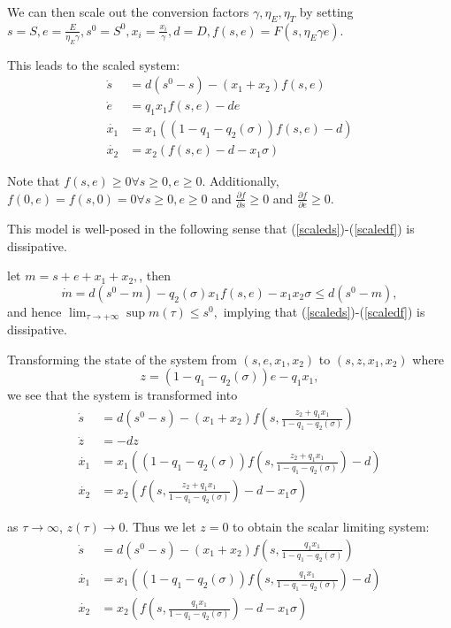 \documentclass[12pt]{article}
\begin{document}
\noindent We can then scale out the conversion factors $\gamma, \eta_E , \eta_T$ by setting $s=S, e=\frac{E}{\eta_E \gamma}, s^0=S^0, x_i=\frac{x_i}{\gamma}, d=D, f(s,e)=F(s,\eta_E \gamma e)$. 

This leads to the scaled system: 
\begin{align}
\dot{s}&=d(s^0-s)-(x_1 + x_2) f(s,e) \label{scaleds}\\
\dot{e}&=q_1 x_1 f(s,e)-de\\
\dot{x_1} &= x_1((1-q_1-q_2(\sigma ))f(s,e)-d)\\
\dot{x_2}&=x_2(f(s,e)-d-x_1 \sigma)\label{scaledf}
\end{align}

\noindent Note that $f(s,e) \geq 0 \forall s\geq 0, e\geq 0.$ Additionally, $f(0,e)=f(s,0)=0 \forall s\geq 0, e\geq 0$ and $\frac{\partial f}{\partial s} \geq 0$ and $\frac{\partial f}{\partial e} \geq 0$.  

\noindent This model is well-posed in the following sense that (\ref{scaleds})-(\ref{scaledf}) is dissipative.

\noindent let $m=s+e+x_1+x_2,$, then $$\dot{m}=d(s^0-m)-q_2(\sigma )x_1 f(s,e)- x_1 x_2 \sigma \leq d(s^0-m),$$ and hence $\lim_{\tau \rightarrow +\infty} \sup m(\tau) \leq s^0,$ implying that (\ref{scaleds})-(\ref{scaledf}) is dissipative. 

Transforming the state of the system from $(s,e,x_1,x_2)$ to $(s,z,x_1,x_2)$ where $$z=(1-q_1-q_2(\sigma ))e-q_1x_1,$$ we see that the system is transformed into
\begin{align*}
\dot{s}&=d(s^0-s)-(x_1+x_2)f(s,\frac{z_2+q_1 x_1}{1-q_1-q_2(\sigma )})\\
\dot{z}&=-dz\\
\dot{x_1}&=x_1((1-q_1-q_2(\sigma ))f(s,{\frac{z_2+q_1 x_1}{1-q_1-q_2(\sigma )}})-d)\\
\dot{x_2}&=x_2(f(s,{\frac{z_2+q_1 x_1}{1-q_1-q_2(\sigma )}})-d-x_1 \sigma)
\end{align*}

\noindent as $\tau \rightarrow \infty$, $z(\tau )\rightarrow 0$. Thus we let $z=0$ to obtain the scalar limiting system: 
\begin{align}
\dot{s}&=d(s^0-s)-(x_1+x_2)f(s,\frac{q_1 x_1}{1-q_1-q_2(\sigma )}) \label{noes} \\
\dot{x_1}&=x_1((1-q_1-q_2(\sigma ))f(s,\frac{q_1 x_1}{1-q_1-q_2(\sigma )})-d)\\
\dot{x_2}&=x_2(f(s,\frac{q_1 x_1}{1-q_1-q_2(\sigma )})-d-x_1 \sigma)\label{noef}
\end{align}
\end{document}
